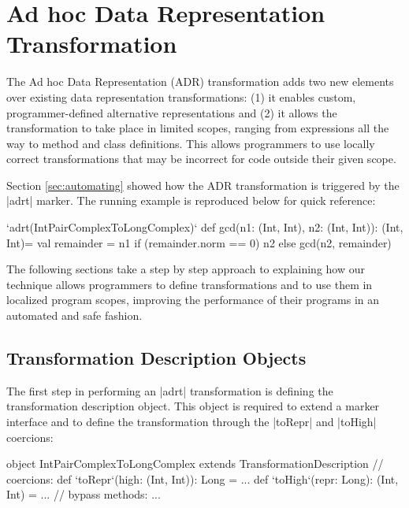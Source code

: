 \section{Ad hoc Data Representation Transformation}
\label{sec:ildl}

The Ad hoc Data Representation (ADR) transformation adds two new elements over existing data representation transformations: (1) it enables custom, programmer-defined alternative representations and (2) it allows the transformation to take place in limited scopes, ranging from expressions all the way to method and class definitions. This allows programmers to use locally correct transformations that may be incorrect for code outside their given scope.

Section \ref{sec:automating} showed how the ADR transformation is triggered by the |adrt| marker. The running example is reproduced below for quick reference:

\begin{lstlisting-nobreak}
`adrt(IntPairComplexToLongComplex)` {
  def gcd(n1: (Int, Int), n2: (Int, Int)): (Int, Int)={
    val remainder = n1 %
    if (remainder.norm == 0) n2 else gcd(n2, remainder)
  }
}
\end{lstlisting-nobreak}

The following sections take a step by step approach to explaining how our technique allows programmers to define transformations and to use them in localized program scopes,  improving the performance of their programs in an automated and safe fashion.


\subsection{Transformation Description Objects}
\label{sec:ildl:custom}

The first step in performing an |adrt| transformation is defining the transformation description object. This object is required to extend a marker interface and to define the transformation through the |toRepr| and |toHigh| coercions:

\begin{lstlisting-nobreak}
object IntPairComplexToLongComplex
          extends TransformationDescription {
  // coercions:
  def `toRepr`(high: (Int, Int)): Long = ...
  def `toHigh`(repr: Long): (Int, Int) = ...
  // bypass methods:
  ...
}
\end{lstlisting-nobreak}

